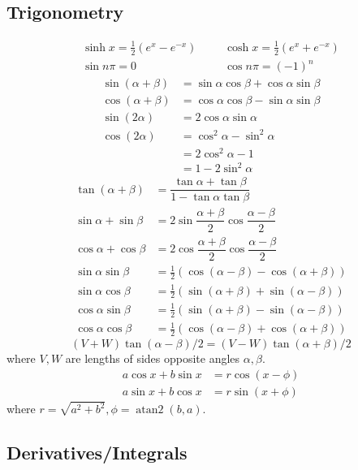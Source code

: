 \subsection{Trigonometry}
\begin{align*}
    \sinh x = \frac{1}{2}(e^x - e^{-x}) &&& \cosh x = \frac{1}{2}(e^x + e^{-x}) \\
    \sin n\pi = 0 &&& \cos n\pi = (-1)^n
\end{align*}
\begin{align*}
\sin(\alpha+\beta)&{}=\sin \alpha\cos \beta+\cos \alpha\sin \beta\\
\cos(\alpha+\beta)&{}=\cos \alpha\cos \beta-\sin \alpha\sin \beta\\
\sin(2\alpha) &{}=2\cos \alpha \sin \alpha \\
\cos(2\alpha) &{}=\cos^2 \alpha - \sin^2 \alpha \\
         &{}=2\cos^2 \alpha - 1 \\
         &{}=1 - 2 \sin^2 \alpha
\end{align*}
\begin{align*}
\tan(\alpha+\beta)&{}=\dfrac{\tan \alpha+\tan \beta}{1-\tan \alpha\tan \beta}\\
\sin \alpha+\sin \beta&{}=2\sin\dfrac{\alpha+\beta}{2}\cos\dfrac{\alpha-\beta}{2}\\
\cos \alpha+\cos \beta&{}=2\cos\dfrac{\alpha+\beta}{2}\cos\dfrac{\alpha-\beta}{2} \\
\sin \alpha \sin \beta&{}=\frac{1}{2}(\cos(\alpha - \beta) - \cos(\alpha + \beta)) \\
\sin \alpha \cos \beta&{}=\frac{1}{2}(\sin(\alpha + \beta) + \sin(\alpha - \beta)) \\
\cos \alpha \sin \beta&{}=\frac{1}{2}(\sin(\alpha + \beta) - \sin(\alpha - \beta)) \\
\cos \alpha \cos \beta&{}=\frac{1}{2}(\cos(\alpha - \beta) + \cos(\alpha + \beta))
\end{align*}
\[ (V+W)\tan(\alpha-\beta)/2{}=(V-W)\tan(\alpha+\beta)/2 \]
where $V, W$ are lengths of sides opposite angles $\alpha, \beta$.
\begin{align*}
	a\cos x+b\sin x&=r\cos(x-\phi)\\
	a\sin x+b\cos x&=r\sin(x+\phi)
\end{align*}
where $r=\sqrt{a^2+b^2}, \phi=\operatorname{atan2}(b,a)$.

\subsection{Derivatives/Integrals}


